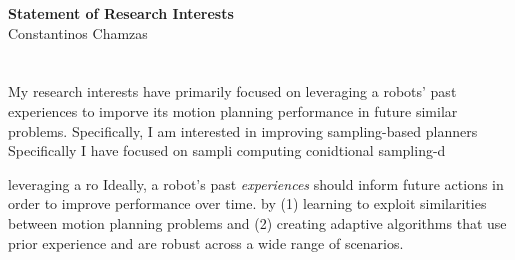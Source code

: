 \documentclass[12pt]{article}
\begin{document}
\begin{center}
  {\large \textbf{Statement of Research Interests}} \\[0.1em]
  {Constantinos Chamzas}
\end{center}
\vspace{-10pt}

\section{}
My research interests have primarily focused on leveraging a robots' past experiences to imporve its motion planning performance in future similar problems. %
Specifically, I am interested in improving sampling-based planners    
Specifically I have focused on sampli computing conidtional sampling-d

leveraging a ro
Ideally, a robot's past \textit{experiences} should inform future actions in order to improve performance over time.
by (1) learning to exploit similarities between motion planning problems and (2) creating adaptive algorithms that use prior experience and are robust across a wide range of scenarios.
\end{document}
